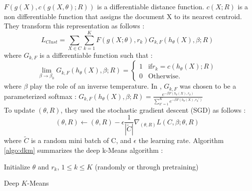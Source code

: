 $F(g(X),c(g(X, \theta); R))$ is a differentiable distance function.
$c(X ; R)$ is a non differentiable function that assigns the document X
to its nearest centroid.\\
They transform this representation as follows :
\begin{equation}
L_{Clust} = \sum\limits_{X \in C}\sum\limits_{k=1}^K F(g(X; \theta), r_k) G_{k, F}(h_\theta(X), \beta; R)
\end{equation}
where $G_{k, F}$ is a differentiable function such that :
\begin{equation}
  \lim\limits_{\beta \rightarrow \beta_0}G_{k, F}(h_\theta(X), \beta; R) = \left\{
\begin{array}{ll}
  1 & \mbox{if} r_k = c(h_\theta(X); R)\\
  0 & \mbox{Otherwise.}
\end{array}
\right.
\end{equation}
where $\beta$ play the role of an inverse temperature. In \cite{Deap-K-Means}
, $G_{k,F}$ was chosen to be a parameterized softmax : 
$G_{k, F}(h_\theta(X), \beta; R) = \frac{e^{-\beta F(h_\theta(X),r_k)}}
{\sum\limits_{k' = 1}^K e^{-\beta F(h_\theta(X),r_k')}}$\\
To update $(\theta, R)$, they used the stochastic gradient descent (SGD)
as follows :
\begin{equation}
  (\theta, R) \gets (\theta, R) - \epsilon \frac{1}{|\widetilde{C}|}
  \nabla_{(\theta, R)} L(C, \beta; \theta, R)
\end{equation}
where $\widetilde{C}$ is a random mini batch of C, and $\epsilon$ the
learning rate.
Algorithm \ref{algo:dkm} summarizes the deep k-Means algorithm :
\begin{algorithm}[!h]
  Initialize $\theta$ and $r_k$, $1 \leq k \leq K$ (randomly or through 
  pretraining)\\
  \caption{\label{algo:dkm}Deep $K$-Means}
\end{algorithm}
